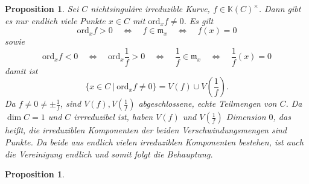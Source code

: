 \documentclass[11pt]{book}
\newtheorem{prop}[theorem]{Proposition}
\theoremstyle{nonumberbreak}
\newenvironment{pr}[1][]{\ifthenelse{\equal{#1}{}}{\proof}{\proof[#1]}\rm}{\endproof}
\begin{document}
\begin{spacing}{1.3}
\begin{prop}
Sei $C$ nichtsinguläre irreduzible Kurve, $f \in \mathbb{K}(C)^{\times}$. Dann gibt es nur endlich viele Punkte $x \in C$ mit $\textrm{ord}_x f \neq 0$.
\begin{pr}
Es gilt
$$ \textrm{ord}_x f >0 \quad \Longleftrightarrow \quad f \in \mathfrak{m}_x \quad \Longleftrightarrow \quad f(x)=0$$
sowie
$$\textrm{ord}_x f <0 \quad \Longleftrightarrow \quad \textrm{ord}_x \frac{1}{f} >0 \quad \Longleftrightarrow \quad \frac{1}{f} \in \mathfrak{m}_x \quad \Longleftrightarrow \quad \frac{1}{f}(x) = 0$$
damit ist 
$$\{x \in C \ \vert \ \textrm{ord}_x f \neq 0 \} = V(f) \cup V \left(\frac{1}{f}\right).$$
Da $f \neq 0 \neq \pm \frac{1}{f}$, sind $V(f), V\left(\frac{1}{f}\right)$ abgeschlossene, echte Teilmengen von $C$. Da $\dim C=1$ und $C$ irrreduzibel ist, haben $V(f)$ und $V\left(\frac{1}{f}\right)$ Dimension $0$, das heißt, die irreduziblen Komponenten der beiden Verschwindungsmengen sind Punkte. Da beide aus endlich vielen irreduziblen Komponenten bestehen, ist auch die Vereinigung endlich und somit folgt die Behauptung.
\end{pr}
\end{prop}


\begin{prop} %


\end{prop}
\end{spacing}
\end{document}

